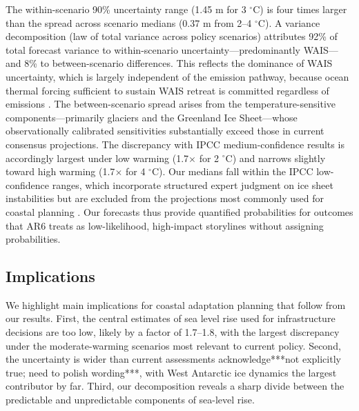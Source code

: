 \documentclass[12pt]{article}
\begin{document}
The within-scenario 90\% uncertainty range (1.45 m for 3 $^\circ$C) is four times larger than the spread across scenario medians (0.37 m from 2--4 $^\circ$C). A variance decomposition (law of total variance across policy scenarios) attributes 92\% of total forecast variance to within-scenario uncertainty---predominantly WAIS---and 8\% to between-scenario differences. This reflects the dominance of WAIS uncertainty, which is largely independent of the emission pathway, because ocean thermal forcing sufficient to sustain WAIS retreat is committed regardless of emissions \citep{Naughten2023}. The between-scenario spread arises from the temperature-sensitive components---primarily glaciers and the Greenland Ice Sheet---whose observationally calibrated sensitivities substantially exceed those in current consensus projections. The discrepancy with IPCC medium-confidence results is accordingly largest under low warming (1.7$\times$ for 2 $^\circ$C) and narrows slightly toward high warming (1.7$\times$ for 4 $^\circ$C). Our medians fall within the IPCC low-confidence ranges, which incorporate structured expert judgment on ice sheet instabilities but are excluded from the projections most commonly used for coastal planning \citep{Fox-Kemper2021, Hirschfeld2023}. Our forecasts thus provide quantified probabilities for outcomes that AR6 treats as low-likelihood, high-impact storylines without assigning probabilities.

\subsection*{Implications}

We highlight main implications for coastal adaptation planning that follow from our results. First, the central estimates of sea level rise used for infrastructure decisions are too low, likely by a factor of 1.7--1.8, with the largest discrepancy under the moderate-warming scenarios most relevant to current policy. Second, the uncertainty is wider than current assessments acknowledge***not explicitly true; need to polish wording***, with West Antarctic ice dynamics the largest contributor by far. Third, our decomposition reveals a sharp divide between the predictable and unpredictable components of sea-level rise. 
\end{document}
